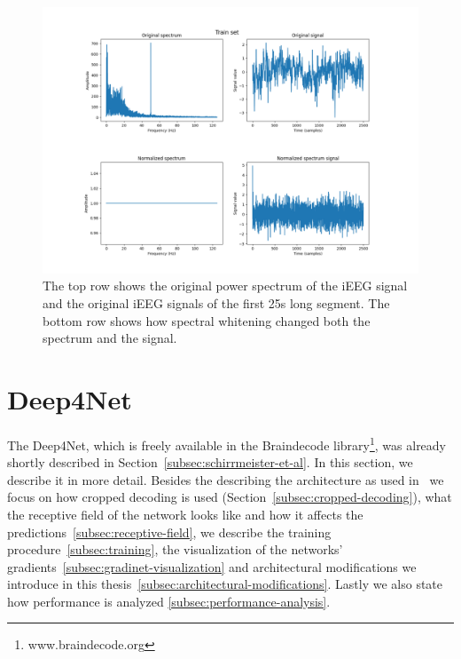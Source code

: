\begin{figure}[!htbp]
\centering
\includegraphics[width=\linewidth]{img/ch3/spectral-whitening}
\caption[Spectral whitening]{The top row shows the original power spectrum of the iEEG signal and the original iEEG signals of the first 25s long segment.
The bottom row shows how spectral whitening changed both the spectrum and the signal.}
\label{fig:spectral-whitening}
\end{figure}


\section{Deep4Net}\label{sec:deep4net}
The Deep4Net, which is freely available in the Braindecode library\footnote{www.braindecode.org}, was already shortly described in Section~\ref{subsec:schirrmeister-et-al}.
In this section, we describe it in more detail. 
Besides the describing the architecture as used in~\cite{Hammer-2021} we focus on how cropped decoding is used (Section~\ref{subsec:cropped-decoding}), what the receptive field of the network looks like and how it affects the predictions~\ref{subsec:receptive-field}, we describe the training procedure~\ref{subsec:training}, the visualization of the networks' gradients~\ref{subsec:gradinet-visualization} and architectural modifications we introduce in this thesis~\ref{subsec:architectural-modifications}. Lastly we also state how performance is analyzed \ref{subsec:performance-analysis}.


